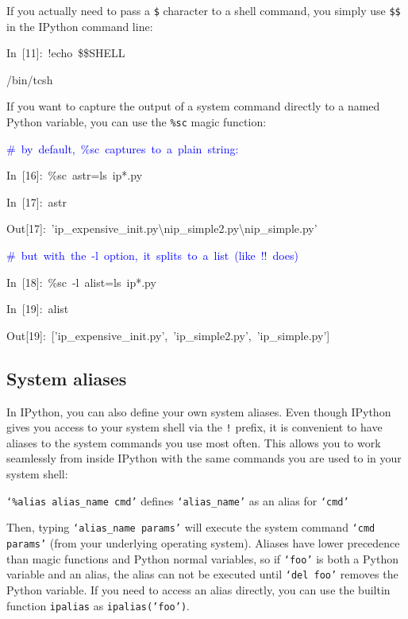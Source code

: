 If you actually need to pass a \texttt{\$} character to a shell command,
you simply use \texttt{\$\$} in the IPython command line:

\begin{lyxcode}
In~{[}11]:~!echo~\$\$SHELL

/bin/tcsh
\end{lyxcode}
If you want to capture the output of a system command directly to
a named Python variable, you can use the \texttt{\%sc} magic function:

\begin{lyxcode}
\textcolor{blue}{\#~by~default,~\%sc~captures~to~a~plain~string:}

In~{[}16]:~\%sc~astr=ls~ip{*}.py

In~{[}17]:~astr

Out{[}17]:~'ip\_expensive\_init.py\textbackslash{}nip\_simple2.py\textbackslash{}nip\_simple.py'

\textcolor{blue}{\#~but~with~the~-l~option,~it~splits~to~a~list~(like~!!~does)}

In~{[}18]:~\%sc~-l~alist=ls~ip{*}.py

In~{[}19]:~alist

Out{[}19]:~{[}'ip\_expensive\_init.py',~'ip\_simple2.py',~'ip\_simple.py']
\end{lyxcode}

\subsection{System aliases}

In IPython, you can also define your own system aliases. Even though
IPython gives you access to your system shell via the \texttt{!} prefix,
it is convenient to have aliases to the system commands you use most
often. This allows you to work seamlessly from inside IPython with
the same commands you are used to in your system shell:

\texttt{`\%alias alias\_name cmd'} defines \texttt{`alias\_name'}
as an alias for \texttt{`cmd'}

Then, typing \texttt{`alias\_name params'} will execute the system
command \texttt{`cmd params'} (from your underlying operating system).
Aliases have lower precedence than magic functions and Python normal
variables, so if \texttt{`foo'} is both a Python variable and an alias,
the alias can not be executed until \texttt{`del foo'} removes the
Python variable. If you need to access an alias directly, you can
use the builtin function \texttt{ipalias} as \texttt{ipalias('foo')}.

